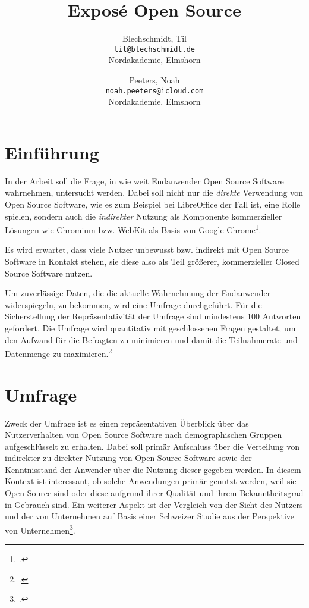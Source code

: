 \documentclass[a4paper]{article}
\title{Exposé Open Source}
\author{
  Blechschmidt, Til\\
  \texttt{til@blechschmidt.de}\\
  Nordakademie, Elmshorn
  \and
  Peeters, Noah\\
  \texttt{noah.peeters@icloud.com}\\
  Nordakademie, Elmshorn
}
\begin{document}
	\maketitle
	
	\section{Einführung}
		
		In der Arbeit soll die Frage, in wie weit Endanwender Open Source Software wahrnehmen, untersucht werden. Dabei soll nicht nur die \emph{direkte} Verwendung von Open Source Software, wie es zum Beispiel bei LibreOffice der Fall ist, eine Rolle spielen, sondern auch die \emph{indirekter} Nutzung als Komponente kommerzieller Lösungen wie Chromium bzw. WebKit als Basis von Google Chrome\footcite{is:open:source:right:for:you}.
		
		Es wird erwartet, dass viele Nutzer unbewusst bzw. indirekt mit Open Source Software in Kontakt stehen, sie diese also als Teil größerer, kommerzieller Closed Source Software nutzen.
		
		Um zuverlässige Daten, die die aktuelle Wahrnehmung der Endanwender widerspiegeln, zu bekommen, wird eine Umfrage durchgeführt. Für die Sicherstellung der Repräsentativität der Umfrage sind mindestens 100 Antworten gefordert. %
		Die Umfrage wird quantitativ mit geschlossenen Fragen gestaltet, um den Aufwand für die Befragten zu minimieren und damit die Teilnahmerate und Datenmenge zu maximieren.\footcite{handbuch:methoden}
	
	\section{Umfrage}
		Zweck der Umfrage ist es einen repräsentativen Überblick über das Nutzerverhalten von Open Source Software nach demographischen Gruppen aufgeschlüsselt zu erhalten. Dabei soll primär Aufschluss über die Verteilung von indirekter zu direkter Nutzung von Open Source Software sowie der Kenntnisstand der Anwender über die Nutzung dieser gegeben werden. In diesem Kontext ist interessant, ob solche Anwendungen primär genutzt werden, weil sie Open Source sind oder diese aufgrund ihrer Qualität und ihrem Bekanntheitsgrad in Gebrauch sind. Ein weiterer Aspekt ist der Vergleich von der Sicht des Nutzers und der von Unternehmen auf Basis einer Schweizer Studie aus der Perspektive von Unternehmen\footcite{oss:studie}.\\
\end{document}
